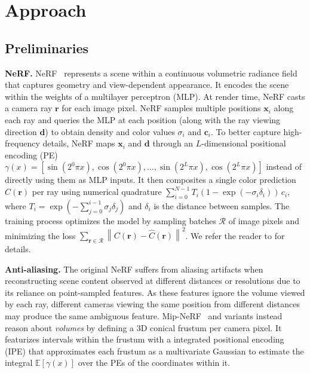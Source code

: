 \documentclass{article}
\newcommand{\norm}[1]{\left\lVert#1\right\rVert}
\begin{document}
\section{Approach}

\subsection{Preliminaries}

\textbf{NeRF.} NeRF~\cite{mildenhall2020nerf} represents a scene within a continuous volumetric radiance field that captures geometry and view-dependent appearance. It encodes the scene within the weights of a multilayer perceptron (MLP). At render time, NeRF casts a camera ray $\mathbf{r}$ for each image pixel. NeRF samples multiple positions $\mathbf{x}_i$ along each ray and queries the MLP at each position (along with the ray viewing direction $\mathbf{d}$) to obtain density and color values $\sigma_i$ and $\mathbf{c}_i$. To better capture high-frequency details, NeRF maps $\mathbf{x}_i$ and $\mathbf{d}$ through an $L$-dimensional positional encoding (PE) $\gamma(x) = [\sin(2^0 \pi x), \cos(2^0 \pi x), \ldots, \sin(2^L \pi x), \cos(2^L \pi x)]$ instead of directly using them as MLP inputs. It then composites a single color prediction $\hat{C}(\mathbf{r})$ per ray using numerical quadrature $\sum_{i=0}^{N-1} T_i (1 - \exp( -\sigma_{i} \delta_{i})) \, c_i$, where $T_i = \exp( -\sum_{j=0}^{i-1} \sigma_j \delta_j)$ and $\delta_i$ is the distance between samples. The training process optimizes the model by sampling batches $\mathcal{R}$ of image pixels and minimizing the loss $\sum_{\mathbf{r} \in \mathcal{R}} \norm{C(\mathbf{r}) - \hat{C}(\mathbf{r})}^2$. We refer the reader to \citet{mildenhall2020nerf} for details.

\textbf{Anti-aliasing.} The original NeRF suffers from aliasing artifacts when reconstructing scene content observed at different distances or resolutions due to its reliance on point-sampled features. As these features ignore the volume viewed by each ray, different cameras viewing the same position from different distances may produce the same ambiguous feature. Mip-NeRF~\cite{barron2021mipnerf} and variants instead reason about \textit{volumes} by defining a 3D conical frustum per camera pixel. It featurizes intervals within the frustum with a integrated positional encoding (IPE) that approximates each frustum as a multivariate Gaussian to estimate the integral $\mathbb{E}[\gamma(x)]$ over the PEs of the coordinates within it. 
\end{document}
